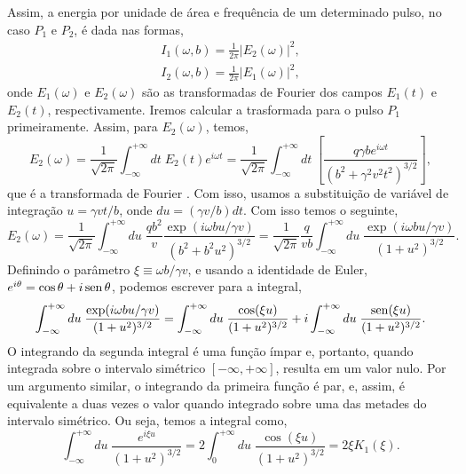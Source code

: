 Assim, a energia por unidade de área e frequência de um determinado
pulso, no caso $P_1$ e $P_2$, é dada nas formas,
\begin{gather}
	I_1(\omega , b) = \frac{1}{2\pi} |E_2 (\omega) |^2 ,\\
	I_2 (\omega , b) = \frac{1}{2\pi} |E_1 (\omega)|^2 ,
\end{gather}
onde $E_1 (\omega)$ e $E_2 (\omega)$ são as transformadas de Fourier dos campos
$E_1(t)$ e $E_2 (t)$, respectivamente. Iremos calcular a trasformada para o
pulso $P_1$ primeiramente. Assim, para $E_2 (\omega)$, temos,
\begin{equation}
	E_2 (\omega) = \frac{1}{\sqrt{2\pi}} \int _{-\infty} ^{+\infty} dt \; E_2
	(t) e^{i\omega t} = \frac{1}{\sqrt{2\pi}} \int _{-\infty} ^{+\infty} dt \;
	\left[ \frac{q \gamma b e^{i\omega t}}{(b^2 + \gamma ^2 v^2 t^2)^{3/2}}
	\right],
\end{equation}
que é a transformada de Fourier \cite{arfken7ed}. Com isso, usamos a
substituição de variável de integração $u = \gamma vt/b$, onde $du = (\gamma
v/b) dt$. Com isso temos o seguinte,
\begin{equation}
	E_2 (\omega) = \frac{1}{\sqrt{2\pi}} \int _{-\infty} ^{+ \infty} du\;
	\frac{qb^2}{v} \frac{\exp (i\omega b u/ \gamma v)}{(b^2 + b^2 u^2)^{3/2}} =
	\frac{1}{\sqrt{2\pi}} \frac{q}{vb} \int _{-\infty}^{+\infty} du \;
	\frac{\exp (i \omega b u/ \gamma v)}{ (1+ u^2)^{3/2}}.
\end{equation}
Definindo o parâmetro $\xi \equiv \omega b / \gamma v$, e usando a identidade
de Euler, $e ^{i\theta} = \cos \theta + i \operatorname*{sen} \theta$, podemos escrever para a
integral,
\begin{equation}
	\int _{-\infty} ^{+\infty} du\; \frac{\exp (i \omega b u/ \gamma v)}{ (1+
	u^2)^{3/2}} = \int _{-\infty} ^{+\infty} du \; \frac{\cos (\xi u)}{(1 + u^2 )^{3/2}}
	+ i \int _{-\infty} ^{+\infty} du \; \frac{\operatorname*{sen}(\xi u)}{(1 + u^2)^{3/2}}.
\end{equation}
O integrando da segunda integral é uma função ímpar e, portanto, quando
integrada sobre o intervalo simétrico $[-\infty , + \infty]$, resulta em 
um valor nulo. Por um argumento similar, o integrando da primeira função
é par, e, assim, é equivalente a duas vezes o valor quando integrado sobre
uma das metades do intervalo simétrico. Ou seja, temos a integral como,
\begin{equation}
	\int _{-\infty} ^{+\infty} du\; \frac{e^{i \xi u}}{(1+u^2)^{3/2}} = 2 \int
	_0 ^{+\infty} du \; \frac{\cos (\xi u )}{(1 + u^2)^{3/2}} = 2 \xi K_1 (\xi).
\end{equation}
